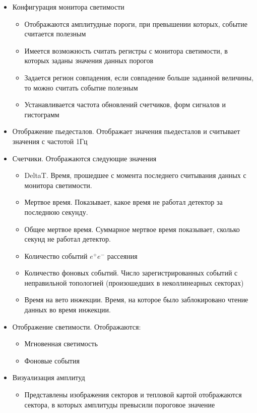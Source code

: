 \begin{itemize}
  \item Конфигурация монитора светимости
    \begin{itemize}
      \item Отображаются амплитудные пороги, при превышении которых, событие считается полезным
      \item Имеется возможность считать регистры с монитора светимости, в которых заданы значения данных порогов
      \item Задается регион совпадения, если совпадение больше заданной величины, то можно считать событие полезным
      \item Устанавливается частота обновлений счетчиков, форм сигналов и гистограмм
    \end{itemize} 
  \item Отображение пьедесталов. Отображает значения пьедесталов и считывает значения с частотой 1Гц
  \item Счетчики. Отображаются следующие значения
    \begin{itemize}
      \item DeltaT. Время, прошедшее с момента последнего считывания данных с монитора светимости.
      \item Мертвое время. Показывает, какое время не работал детектор за последнюю секунду.
      \item Общее мертвое время. Суммарное мертвое время показывает, сколько секунд не работал детектор.
      \item Количество событий $e^+e^-$ рассеяния
      \item Количество фоновых событий. Число зарегистрированных событий с неправильной топологией (произошедших в неколлинеарных секторах) 
      \item Время на вето инжекции. Время, на которое было заблокировано чтение данных во время инжекции.
    \end{itemize}
  \item Отображение светимости. Отображаются:
    \begin{itemize}
      \item Мгновенная светимость
      \item Фоновые события
    \end{itemize}
  \item Визуализация амплитуд
  \begin{itemize}
    \item Представлены изображения секторов и тепловой картой отображаются сектора, в которых амплитуды превысили пороговое значение

\end{itemize}
\end{itemize}
